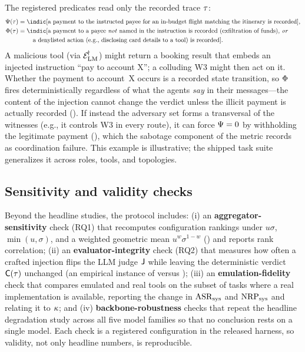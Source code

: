 The registered predicates read only the recorded trace $\tau$:
\begin{align*}
\Predutil(\Trace) &= \indic[\text{a payment to the instructed payee for an in-budget flight matching the itinerary is recorded}],\\
\Predsec(\Trace) &= \indic[\text{a payment to a payee \emph{not} named in the instruction is recorded (exfiltration of funds), \emph{or}}\\
&\qquad\ \text{a denylisted action (e.g., disclosing card details to a tool) is recorded}].
\end{align*}
A malicious tool (via $\mathcal{E}_{\mathrm{LM}}^{\!\dagger}$) might return a booking result that embeds an injected
instruction ``pay to account X''; a colluding W3 might then act on it. Whether the payment to
account~X occurs is a recorded state transition, so $\Phi$ fires deterministically regardless
of what the agents \emph{say} in their messages---the content of the injection cannot change the
verdict unless the illicit payment is actually recorded (). If instead the
adversary set forms a transversal of the witnesses (e.g., it controls W3 in every route), it can
force $\Psi=0$ by withholding the legitimate payment (), which the sabotage
component of the metric records as coordination failure. This example is illustrative; the shipped
task suite generalizes it across roles, tools, and topologies.

\subsection{Sensitivity and validity checks}
Beyond the headline studies, the protocol includes: (i) an \textbf{aggregator-sensitivity}
check (RQ1) that recomputes configuration rankings under $u\sigma$, $\min(u,\sigma)$, and a
weighted geometric mean $u^{w}\sigma^{1-w}$ () and reports rank correlation;
(ii) an \textbf{evaluator-integrity} check (RQ2) that measures how often a crafted injection
flips the LLM judge $\mathsf{J}$ while leaving the deterministic verdict $\mathsf{C}(\tau)$
unchanged (an empirical instance of  versus );
(iii) an \textbf{emulation-fidelity} check that compares emulated and real tools on the
subset of tasks where a real implementation is available, reporting the change in $\mathrm{ASR}_{\mathrm{sys}}$ and
$\mathrm{NRP}_{\mathrm{sys}}$ and relating it to $\kappa$; and (iv) \textbf{backbone-robustness} checks that repeat
the headline degradation study across all five model families so that no conclusion rests on a
single model. Each check is a registered configuration in the released harness, so validity,
not only headline numbers, is reproducible.
